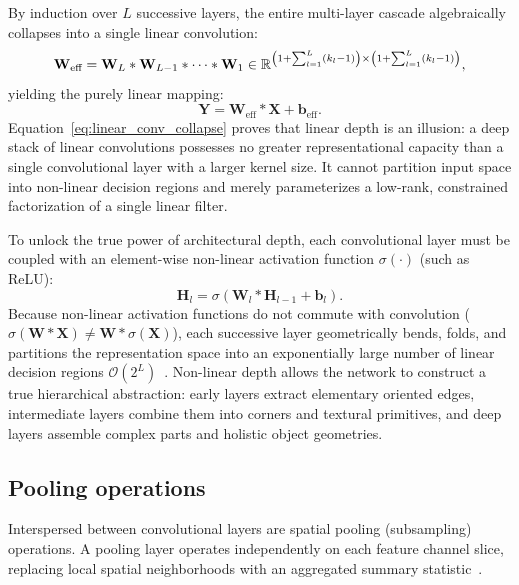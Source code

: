 By induction over $L$ successive layers, the entire multi-layer cascade algebraically collapses into a single linear convolution:
\begin{equation}
\mathbf{W}_{\text{eff}} = \mathbf{W}_L * \mathbf{W}_{L-1} * \dots * \mathbf{W}_1 \in \mathbb{R}^{\left(1 + \sum_{l=1}^L (k_l - 1)\right) \times \left(1 + \sum_{l=1}^L (k_l - 1)\right)},
\end{equation}
yielding the purely linear mapping:
\begin{equation}
\mathbf{Y} = \mathbf{W}_{\text{eff}} * \mathbf{X} + \mathbf{b}_{\text{eff}}.
\label{eq:linear_conv_collapse}
\end{equation}
Equation~\eqref{eq:linear_conv_collapse} proves that linear depth is an illusion: a deep stack of linear convolutions possesses no greater representational capacity than a single convolutional layer with a larger kernel size. It cannot partition input space into non-linear decision regions and merely parameterizes a low-rank, constrained factorization of a single linear filter.

To unlock the true power of architectural depth, each convolutional layer must be coupled with an element-wise non-linear activation function $\sigma(\cdot)$ (such as ReLU):
\begin{equation}
\mathbf{H}_l = \sigma\left(\mathbf{W}_l * \mathbf{H}_{l-1} + \mathbf{b}_l\right).
\end{equation}
Because non-linear activation functions do not commute with convolution ($\sigma(\mathbf{W} * \mathbf{X}) \neq \mathbf{W} * \sigma(\mathbf{X})$), each successive layer geometrically bends, folds, and partitions the representation space into an exponentially large number of linear decision regions $\mathcal{O}(2^L)$~\cite{montufar2014number,telgarsky2016benefits}. Non-linear depth allows the network to construct a true hierarchical abstraction: early layers extract elementary oriented edges, intermediate layers combine them into corners and textural primitives, and deep layers assemble complex parts and holistic object geometries.

\subsection{Pooling operations}
\label{sec:pooling_layers}

Interspersed between convolutional layers are spatial pooling (subsampling) operations. A pooling layer operates independently on each feature channel slice, replacing local spatial neighborhoods with an aggregated summary statistic~\cite{goodfellow2016deep}.

